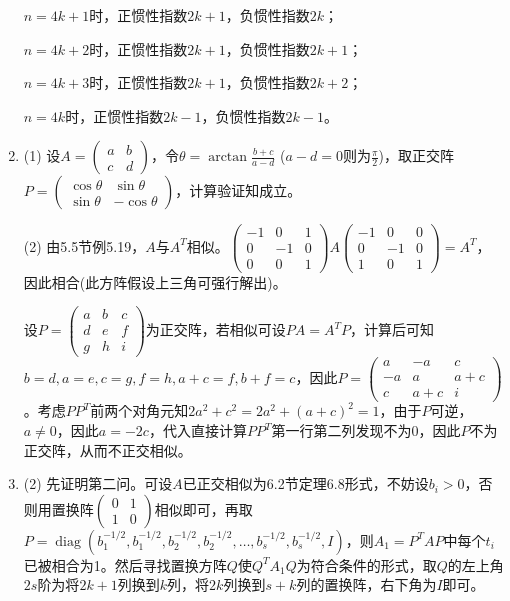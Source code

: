 \documentclass[a4paper,UTF8,fontset=windows]{ctexart}
\DeclareMathOperator{\diag}{diag}
\begin{document}
\begin{enumerate}
$n=4k+1$时，正惯性指数$2k+1$，负惯性指数$2k$；

$n=4k+2$时，正惯性指数$2k+1$，负惯性指数$2k+1$；

$n=4k+3$时，正惯性指数$2k+1$，负惯性指数$2k+2$；

$n=4k$时，正惯性指数$2k-1$，负惯性指数$2k-1$。

\item
(1) 设$A=\begin{pmatrix}a&b\\c&d\end{pmatrix}$，令$\theta=\arctan\frac{b+c}{a-d}$
 ($a-d=0$则为$\frac{\pi}{2}$)，取正交阵$P=\begin{pmatrix}\cos\theta&\sin\theta\\\sin\theta&-\cos\theta\end{pmatrix}$，计算验证知成立。

(2) 由5.5节例5.19，$A$与$A^T$相似。$\begin{pmatrix}-1&0&1\\0&-1&0\\0&0&1\end{pmatrix}A\begin{pmatrix}-1&0&0\\0&-1&0\\1&0&1\end{pmatrix}=A^T$，因此相合(此方阵假设上三角可强行解出)。

设$P=\begin{pmatrix}a&b&c\\d&e&f\\g&h&i\end{pmatrix}$为正交阵，若相似可设$PA=A^TP$，计算后可知$b=d,a=e,c=g,f=h,a+c=f,b+f=c$，因此$P=\begin{pmatrix}a&-a&c\\-a&a&a+c\\c&a+c&i\end{pmatrix}$。考虑$PP^T$前两个对角元知$2a^2+c^2=2a^2+(a+c)^2=1$，由于$P$可逆，$a\ne0$，因此$a=-2c$，代入直接计算$PP^T$第一行第二列发现不为0，因此$P$不为正交阵，从而不正交相似。

\item
(2) 先证明第二问。可设$A$已正交相似为6.2节定理6.8形式，不妨设$b_i>0$，否则用置换阵$\begin{pmatrix}0&1\\1&0\end{pmatrix}$相似即可，再取$P=\diag(b_1^{-1/2},b_1^{-1/2},b_2^{-1/2},b_2^{-1/2},\ldots,b_s^{-1/2},b_s^{-1/2},I)$，则$A_1=P^TAP$中每个$t_i$已被相合为1。然后寻找置换方阵$Q$使$Q^TA_1Q$为符合条件的形式，取$Q$的左上角$2s$阶为将$2k+1$列换到$k$列，将$2k$列换到$s+k$列的置换阵，右下角为$I$即可。


\end{enumerate}
\end{document}
